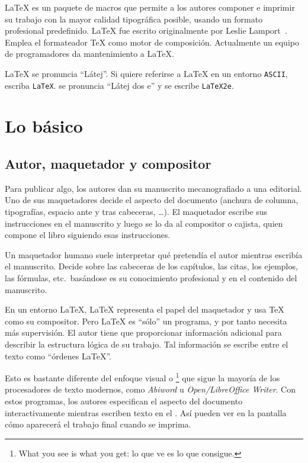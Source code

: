 \LaTeX{} es un paquete de macros que permite a los autores componer e imprimir su trabajo con la mayor calidad tipográfica posible, usando un formato profesional predefinido. \LaTeX{} fue escrito originalmente por Leslie Lamport~\cite{manual}.  Emplea el formateador \TeX{} como motor de composición.  Actualmente  un equipo de programadores da mantenimiento a \LaTeX{}.

\LaTeX{} se pronuncia ``Látej''.  Si quiere referirse a \LaTeX{} en un entorno \texttt{ASCII}, escriba \texttt{LaTeX}. \LaTeXe{} se pronuncia ``Látej dos e'' y se escribe \texttt{LaTeX2e}.


\section{Lo básico}
 
\subsection{Autor, maquetador y compositor}\label{sec:basics}

Para publicar algo, los autores dan su manuscrito mecanografiado a una editorial.  Uno de sus maquetadores decide el aspecto del documento (anchura de columna, tipografías, espacio ante y tras cabeceras, \ldots).  El maquetador escribe sus instrucciones en el manuscrito y luego se lo da al compositor o cajista, quien compone el libro siguiendo esas instrucciones.

Un maquetador humano suele interpretar qué pretendía el autor mientras escribía el manuscrito.  Decide sobre las cabeceras de los capítulos, las citas, los ejemplos, las fórmulas, etc.\ basándose es su conocimiento profesional y en el contenido del manuscrito.

En un entorno \LaTeX{}, \LaTeX{} representa el papel del maquetador y usa \TeX{} como su compositor.  Pero \LaTeX{} es ``sólo'' un programa, y por tanto necesita más supervisión.  El autor tiene que proporcionar información adicional para describir la estructura lógica de su trabajo.  Tal información se escribe entre el texto como ``órdenes \LaTeX{}''.

Esto es bastante diferente del enfoque visual o \footnote{What you see is what you get: lo que ve es lo que consigue.} que sigue la mayoría de los procesadores de texto modernos, como \emph{Abiword} u \emph{Open/Libre\-Office Writer}.  Con estos programas, los autores especifican el aspecto del documento interactivamente mientras escriben texto en el \computernomo{}.  Así pueden ver en la pantalla cómo aparecerá el trabajo final cuando se imprima.

